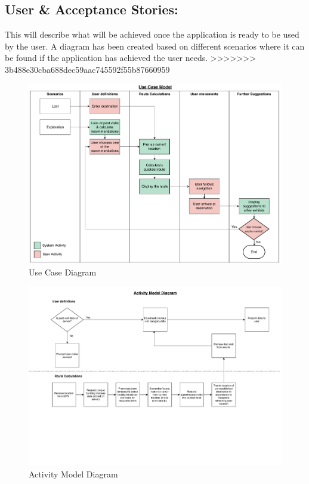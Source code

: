 \subsection{User & Acceptance Stories:}
This will describe what will be achieved once the application is ready to be used by the user. A diagram has been created based on different scenarios where it can be found if the application has achieved the user needs. 
>>>>>>> 3b488e30cba688dec59aac745592f55b87660959

\begin{figure}[H]
    \centering
    \includegraphics[width=\textwidth]
    {assets/use_case.pdf}
    \caption{Use Case Diagram}
    \label{fig:Use Case Diagram}
\end{figure}

\begin{figure}[H]
    \centering
    \includegraphics[angle=90, width=\textwidth]
    {assets/Activity_Diagram.pdf}
    \caption{Activity Model Diagram}
    \label{fig:Activity Model Diagram}
\end{figure}

